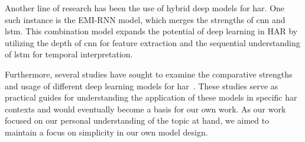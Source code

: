 Another line of research has been the use of hybrid deep models for \gls{har}.
One such instance is the EMI-RNN model, which merges the strengths of \gls{cnn} and \gls{lstm}.
This combination model expands the potential of deep learning in HAR by utilizing the depth of \gls{cnn} for feature extraction and the sequential understanding of \gls{lstm} for temporal interpretation.
~\cite{dennis2018emirnn}

Furthermore, several studies have sought to examine the comparative strengths and usage of different deep learning models for \gls{har}~\cite{watanabeGitHub,pailaGithub,bradwayGitHub}.
These studies serve as practical guides for understanding the application of these models in specific \gls{har} contexts and would eventually become a basis for our own work.
As our work focused on our personal understanding of the topic at hand, we aimed to maintain a focus on simplicity in our own model design.
